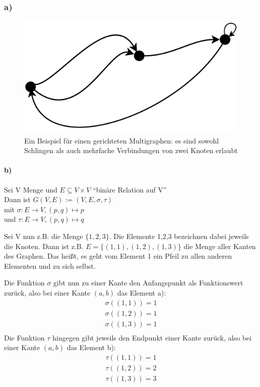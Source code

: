 \subsubsection*{a)}
\begin{figure}[H]
  \begin{center}
  \includegraphics[scale=0.5,keepaspectratio=true]{../bilder/multigraph_bsp.pdf}
 \end{center}
 \caption{Ein Beispiel für einen gerichteten Multigraphen: es sind sowohl Schlingen als auch mehrfache Verbindungen von zwei Knoten erlaubt}
\end{figure}

\paragraph{b)}
Sei V Menge und $E \subseteq V \times V $ ``binäre Relation auf V''
\\Dann ist $G(V,E) := (V,E, \sigma, \tau) $
\\mit $\sigma : E \rightarrow V, (p,q) \mapsto p$
\\und $\tau : E \rightarrow V, (p,q) \mapsto q$

Sei V nun z.B. die Menge $\{1,2,3\}$. Die Elemente 1,2,3 bezeichnen dabei jeweils die Knoten.
Dann ist z.B. $E = \{(1,1), (1,2), (1,3)\}$ die Menge aller Kanten des Graphen. Das heißt, es geht vom Element 1 ein Pfeil zu allen anderen Elementen und zu sich selbst.

Die Funktion $\sigma$ gibt nun zu einer Kante den Anfangspunkt als
Funktionswert zurück, also bei einer Kante $(a,b)$ das Element a):
\begin{align*}
\sigma((1,1)) = 1\\
\sigma((1,2)) = 1\\
\sigma((1,3)) = 1\\
\end{align*}
Die Funktion $\tau$ hingegen gibt jeweils den Endpunkt einer Kante
zurück, also bei einer Kante $(a,b)$ das Element b):
\begin{align*}
\tau((1,1)) = 1\\
\tau((1,2)) = 2\\
\tau((1,3)) = 3\\
\end{align*}


